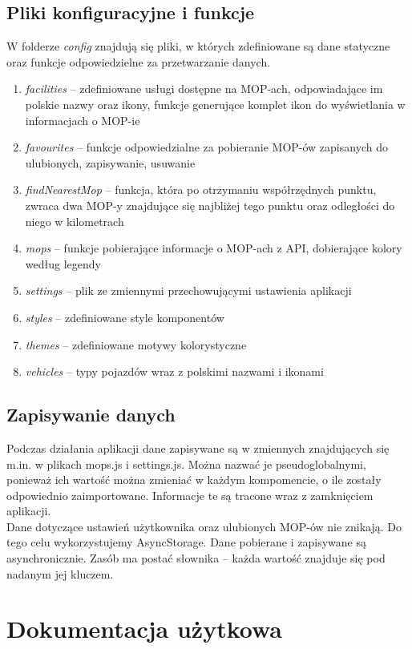 \subsection{Pliki konfiguracyjne i funkcje}
W folderze \textit{config} znajdują się pliki, w których zdefiniowane są dane statyczne oraz funkcje odpowiedzielne za przetwarzanie danych.
\begin{enumerate}
\item \textit{facilities} -- zdefiniowane usługi dostępne na MOP-ach, odpowiadające im polskie nazwy oraz ikony, funkcje generujące komplet ikon do wyświetlania w informacjach o MOP-ie
\item \textit{favourites} -- funkcje odpowiedzialne za pobieranie MOP-ów zapisanych do ulubionych, zapisywanie, usuwanie
\item \textit{findNearestMop} -- funkcja, która po otrzymaniu współrzędnych punktu, zwraca dwa MOP-y znajdujące się najbliżej tego punktu oraz odległości do niego w kilometrach
\item \textit{mops} -- funkcje pobierające informacje o MOP-ach z API, dobierające kolory według legendy
\item \textit{settings} -- plik ze zmiennymi przechowującymi ustawienia aplikacji
\item \textit{styles} -- zdefiniowane style komponentów
\item \textit{themes} -- zdefiniowane motywy kolorystyczne
\item \textit{vehicles} -- typy pojazdów wraz z polskimi nazwami i ikonami
\end{enumerate}

\subsection{Zapisywanie danych}
Podczas działania aplikacji dane zapisywane są w zmiennych znajdujących się m.in. w plikach mops.js i settings.js. Można nazwać je pseudoglobalnymi, ponieważ ich wartość można zmieniać w każdym kompomencie, o ile zostały odpowiednio zaimportowane. Informacje te są tracone wraz z zamknięciem aplikacji.\\
Dane dotyczące ustawień użytkownika oraz ulubionych MOP-ów nie znikają. Do tego celu wykorzystujemy AsyncStorage. Dane pobierane i zapisywane są asynchronicznie. Zasób ma postać słownika -- każda wartość znajduje się pod nadanym jej kluczem.

\section{Dokumentacja użytkowa}


